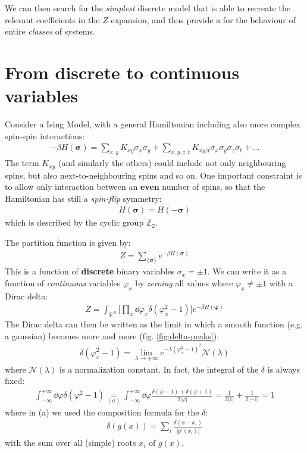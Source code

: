 \documentclass[../../main.tex]{subfiles}
\begin{document}
\medskip

We can then search for the \textit{simplest} discrete model that is able to recreate the relevant coefficients in the $Z$ expansion, and thus provide a  for the behaviour of entire \textit{classes} of systems.   

\section{From discrete to continuous variables}
Consider a Ising Model, with a general Hamiltonian including also more complex spin-spin interactions:
\begin{align}\label{eqn:H-complex}
    -\beta H(\bm{\sigma}) = \sum_{x,y} K_{xy} \sigma_x \sigma_y + \sum_{x,y,z,t} K_{xyzt} \sigma_x \sigma_y \sigma_z \sigma_t + \dots
\end{align}
The term $K_{xy}$ (and similarly the others) could include not only neighbouring spins, but also next-to-neighbouring spins and so on. One important constraint is to allow only interaction between an \textbf{even} number of spins, so that the Hamiltonian has still a \textit{spin-flip} symmetry:
\begin{align*}
    H(\bm{\sigma}) = H(-\bm{\sigma})
\end{align*}  
which is described by the cyclic group $\mathbb{Z}_2$.

\medskip

The partition function is given by:
\begin{align*}
    Z = \sum_{\{\bm{\sigma}\}} e^{-\beta H(\bm{\sigma})}
\end{align*}
This is a function of \textbf{discrete} binary variables $\sigma_x = \pm 1$. We can write it as a function of \textit{continuous} variables $\varphi_x$ by \textit{zeroing} all values where $\varphi_x \neq \pm 1$ with a Dirac delta:
\begin{align}\label{eqn:Z-delta}
    Z = \int_{\mathbb{R}^N} \Big[\prod_x \dd{\varphi_x} \delta(\varphi_x^2- 1)\Big] e^{-\beta H(\bm{\varphi})}
\end{align} 
The Dirac delta can then be written as the limit in which a smooth function (e.g. a gaussian) becomes more and more  (fig. \ref{fig:delta-peaks}):
\begin{align}\label{eqn:delta-limit}
    \delta(\varphi_x^2 - 1) = \lim_{\lambda \to +\infty} e^{- \lambda (\varphi_x^2 - 1)^2} \mathcal{N}(\lambda)
\end{align}
where $\mathcal{N}(\lambda)$ is a normalization constant. In fact, the integral of the $\delta$ is always fixed:
\begin{align}\label{eqn:delta-integral}
    \int_{-\infty}^{+\infty} \dd{\varphi} \delta(\varphi^2- 1) \underset{(a)}{=}  \int_{-\infty}^{+\infty} \dd{\varphi} \frac{\delta(\varphi-1) + \delta(\varphi+1)}{2|\varphi|} = \frac{1}{2|1|} + \frac{1}{2|-1|} = 1  
\end{align}
where in (a) we used the composition formula for the $\delta$:
\begin{align*}
    \delta(g(x)) = \sum_{i} \frac{\delta(x-x_i)}{|g'(x_i)|} 
\end{align*}
with the sum over all (simple) roots $x_i$ of $g(x)$.
\end{document}
